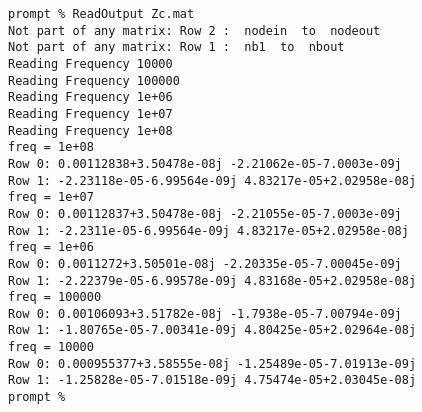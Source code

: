 \begin{verbatim}
prompt % ReadOutput Zc.mat
Not part of any matrix: Row 2 :  nodein  to  nodeout
Not part of any matrix: Row 1 :  nb1  to  nbout
Reading Frequency 10000
Reading Frequency 100000
Reading Frequency 1e+06
Reading Frequency 1e+07
Reading Frequency 1e+08
freq = 1e+08
Row 0: 0.00112838+3.50478e-08j -2.21062e-05-7.0003e-09j 
Row 1: -2.23118e-05-6.99564e-09j 4.83217e-05+2.02958e-08j 
freq = 1e+07
Row 0: 0.00112837+3.50478e-08j -2.21055e-05-7.0003e-09j 
Row 1: -2.2311e-05-6.99564e-09j 4.83217e-05+2.02958e-08j 
freq = 1e+06
Row 0: 0.0011272+3.50501e-08j -2.20335e-05-7.00045e-09j 
Row 1: -2.22379e-05-6.99578e-09j 4.83168e-05+2.02958e-08j 
freq = 100000
Row 0: 0.00106093+3.51782e-08j -1.7938e-05-7.00794e-09j 
Row 1: -1.80765e-05-7.00341e-09j 4.80425e-05+2.02964e-08j 
freq = 10000
Row 0: 0.000955377+3.58555e-08j -1.25489e-05-7.01913e-09j 
Row 1: -1.25828e-05-7.01518e-09j 4.75474e-05+2.03045e-08j 
prompt %
\end{verbatim}